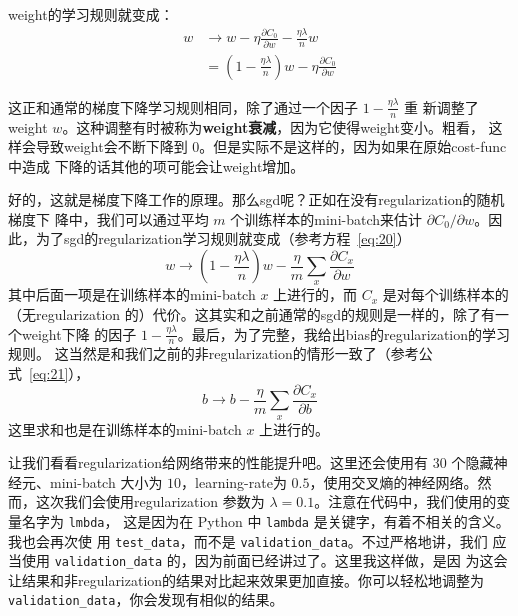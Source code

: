 \gls*{weight}的学习规则就变成：
\begin{align}
  w & \rightarrow w-\eta \frac{\partial C_0}{\partial
      w}-\frac{\eta \lambda}{n} w \label{eq:91}\tag{91}\\
    & = \left(1-\frac{\eta \lambda}{n}\right) w -\eta \frac{\partial
      C_0}{\partial w} \label{eq:92}\tag{92}
\end{align}

这正和通常的梯度下降学习规则相同，除了通过一个因子 $1-\frac{\eta\lambda}{n}$ 重
新调整了\gls*{weight} $w$。这种调整有时被称为\textbf{\gls*{weight}衰减}，因为它使得\gls*{weight}变小。粗看，
这样会导致\gls*{weight}会不断下降到 $0$。但是实际不是这样的，因为如果在原始\gls*{cost-func}中造成
下降的话其他的项可能会让\gls*{weight}增加。

好的，这就是梯度下降工作的原理。那么\gls*{sgd}呢？正如在没有\gls*{regularization}的随机梯度下
降中，我们可以通过平均 $m$ 个训练样本的\gls*{mini-batch}来估计 $\partial C_0/\partial
w$。因此，为了\gls*{sgd}的\gls*{regularization}学习规则就变成（参考方程~\eqref{eq:20}）
\begin{equation}
  w \rightarrow \left(1-\frac{\eta \lambda}{n}\right) w -\frac{\eta}{m}
  \sum_x \frac{\partial C_x}{\partial w}
  \label{eq:93}\tag{93}
\end{equation}
其中后面一项是在训练样本的\gls*{mini-batch} $x$ 上进行的，而 $C_x$ 是对每个训练样本的（无\gls*{regularization}%
的）代价。这其实和之前通常的\gls*{sgd}的规则是一样的，除了有一个\gls*{weight}下降
的因子 $1-\frac{\eta \lambda}{n}$。最后，为了完整，我给出\gls*{bias}的\gls*{regularization}的学习规则。
这当然是和我们之前的非\gls*{regularization}的情形一致了（参考公式~\eqref{eq:21}），
\begin{equation}
  b \rightarrow b - \frac{\eta}{m} \sum_x \frac{\partial C_x}{\partial b}
  \label{eq:94}\tag{94}
\end{equation}
这里求和也是在训练样本的\gls*{mini-batch} $x$ 上进行的。

让我们看看\gls*{regularization}给网络带来的性能提升吧。这里还会使用有 $30$ 个隐藏神经元、\gls*{mini-batch}
大小为 $10$，\gls*{learning-rate}为 $0.5$，使用交叉熵的神经网络。然而，这次我们会使用\gls*{regularization}%
参数为 $\lambda = 0.1$。注意在代码中，我们使用的变量名字为 \lstinline!lmbda!，
这是因为在 Python 中 \lstinline!lambda! 是关键字，有着不相关的含义。我也会再次使
用 \lstinline!test_data!，而不是 \lstinline!validation_data!。不过严格地讲，我们
应当使用 \lstinline!validation_data! 的，因为前面已经讲过了。这里我这样做，是因
为这会让结果和非\gls*{regularization}的结果对比起来效果更加直接。你可以轻松地调整为
\lstinline!validation_data!，你会发现有相似的结果。

